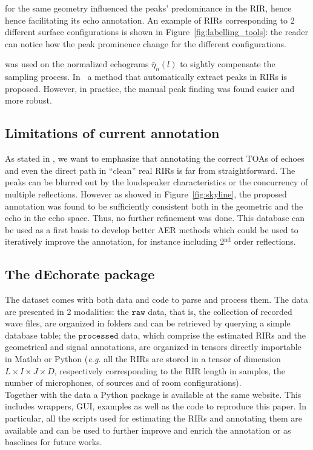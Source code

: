  for the same geometry influenced the peaks' predominance in the RIR, hence hence facilitating its echo annotation. An example of RIRs corresponding to 2 different surface configurations is shown in Figure~\ref{fig:labelling_tools}: the reader can notice how the peak prominence change for the different configurations.

 was used on the normalized echograms $\bar{\eta}_{n}(l)$ to sightly compensate the sampling process. In~\cite{remaggi2017acoustic} a method that automatically extract peaks in RIRs is proposed. However, in practice, the manual peak finding was found easier and more robust.

\subsection{Limitations of current annotation}
As stated in \cite{Defrance2008finding}, we want to emphasize that annotating the correct TOAs of echoes and even the direct path in ``clean'' real RIRs is far from straightforward. The peaks can be blurred out by the loudspeaker characteristics or the concurrency of multiple reflections. However as showed in Figure~\ref{fig:skyline}, the proposed annotation was found to be sufficiently consistent both in the geometric and the echo in the echo space. Thus, no further refinement was done. This database can be used as a first basis to develop better AER methods which could be used to iteratively improve the annotation, for instance including  2$^\text{nd}$ order reflections.

\subsection{The dEchorate package}
The dataset comes with both data and code to parse and process them. The data are presented in 2 modalities: the $\mathtt{raw}$ data, that is, the collection of recorded wave files, are organized in folders and can be retrieved by querying a simple database table; the $\mathtt{processed}$ data, which comprise the estimated RIRs and the geometrical and signal annotations, are organized in tensors directly importable in Matlab or Python (\textit{e.g.} all the RIRs are stored in a tensor of dimension $L \times I \times J \times D$, respectively corresponding to the RIR length in samples, the number of microphones, of sources and of room configurations).
\\Together with the data a Python package is available at the same website. This includes wrappers, GUI, examples as well as the code to reproduce this paper.
In particular, all the scripts used for estimating the RIRs and annotating them are available and can be used to further improve and enrich the annotation or as baselines for future works.

